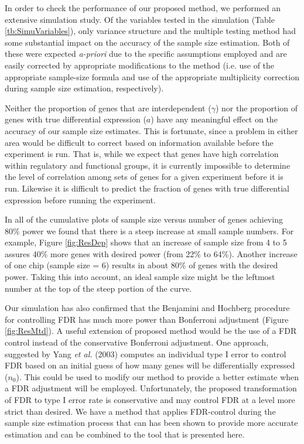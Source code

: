 \documentclass[12pt]{article}
\begin{document}
In order to check the performance of our proposed method, we
performed an extensive simulation study. Of the variables tested
in the simulation (Table \ref{tb:SimuVariables}), only variance
structure and the multiple testing method had some substantial
impact on the accuracy of the sample size estimation.  Both of
these were expected \textit{a-priori} due to the specific
assumptions employed and are easily corrected by appropriate
modifications to the method (i.e. use of the appropriate
sample-size formula and use of the appropriate multiplicity
correction during sample size estimation, respectively).

Neither the proportion of genes that are interdependent ($\gamma$)
nor the proportion of genes with true differential expression ($a$)
have any meaningful effect on the accuracy of our sample size
estimates.  This is fortunate, since a problem in either area would
be difficult to correct based on information available before the
experiment is run.  That is, while we expect that genes have high
correlation within regulatory and functional groups, it is currently
impossible to determine the level of correlation among sets of genes
for a given experiment before it is run.  Likewise it is difficult
to predict the fraction of genes with true differential expression
before running the experiment.

In all of the cumulative plots of sample size versus number of genes
achieving 80\% power we found that there is a steep increase at
small sample numbers. For example, Figure \ref{fig:ResDep} shows
that an increase of sample size from 4 to 5 assures 40\% more genes
with desired power (from 22\% to 64\%).  Another increase of one
chip (sample size = 6) results in about 80\% of genes with the desired
power. Taking this into account, an ideal sample size might be the
leftmost number at the top of the steep portion of the curve.

Our simulation has also confirmed that the Benjamini and Hochberg
procedure for controlling FDR has much more power than Bonferroni
adjustment (Figure \ref{fig:ResMtd}). A useful extension of
proposed method would be the use of a FDR control instead of the
conservative Bonferroni adjustment. One approach, suggested by
Yang \textit{et al.} (2003) computes an individual type I error to
control FDR based on an initial guess of how many genes will be
differentially expressed ($n_0$). This could be used to modify our
method to provide a better estimate when a FDR adjustment will be
employed.  Unfortunately, the proposed transformation of FDR to
type I error rate is conservative and may control FDR at a level
more strict than desired. We have a method that applies
FDR-control during the sample size estimation process that can has
been shown to provide more accurate estimation and can be combined
to the tool that is presented here.
\end{document}
